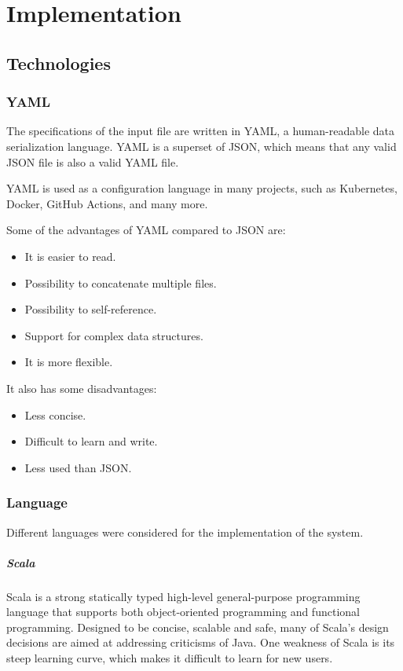\documentclass[12pt,a4paper,openright,twoside]{book}
\begin{document}
\chapter{Implementation}

\section{Technologies}

\subsection*{YAML}
The specifications of the input file are written in YAML, a human-readable data serialization language.
YAML is a superset of JSON, which means that any valid JSON file is also a valid YAML file.

YAML is used as a configuration language in many projects, such as Kubernetes, Docker, GitHub Actions, and many more.

Some of the advantages of YAML compared to JSON are:
\begin{itemize}
  \item It is easier to read.
  \item Possibility to concatenate multiple files.
  \item Possibility to self-reference.
  \item Support for complex data structures.
  \item It is more flexible.
\end{itemize}

It also has some disadvantages:
\begin{itemize}
  \item Less concise.
  \item Difficult to learn and write.
  \item Less used than JSON.
\end{itemize}

\subsection*{Language}
Different languages were considered for the implementation of the system.

\paragraph*{Scala}
Scala is a strong statically typed high-level general-purpose programming language that supports both object-oriented 
programming and functional programming. 
Designed to be concise, scalable and safe, many of Scala's design decisions are aimed at addressing criticisms of Java.
One weakness of Scala is its steep learning curve, which makes it difficult to learn for new users.
\end{document}
